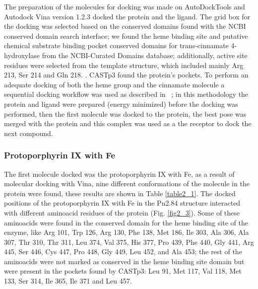 \documentclass[12pt]{article}
\newcommand{\textcite}[1]{\citeauthor{#1}~\citeyear{#1}}
\begin{document}
	The preparation of the molecules for docking was made on AutoDockTools and Autodock Vina version 1.2.3 docked the protein and the ligand. \cite{adt,vina,vina_2} The grid box for the docking was selected based on the conserved domains found with the NCBI conserved domain search interface; we found the heme binding site and putative chemical substrate binding pocket conserved domains for trans-cinnamate 4-hydroxylase from the NCBI-Curated Domains database; additionally, active site residues were selected from the template structure, which included mainly Arg 213, Ser 214 and Gln 218. \cite{cdd,cdd_2}.  CASTp3 found the protein's pockets. \cite{castp} To perform an adequate docking of both the heme group and the cinnamate molecule a sequential docking workflow was used as described in \textcite{sequential}; in this methodology the protein and ligand were prepared (energy minimized) before the docking was performed, then the first molecule was  docked to the protein, the best pose was merged with the protein and this complex was used as a the receptor to dock the next compound.
	
	\newpage
	\subsubsection{Protoporphyrin IX with Fe}
	
	The first molecule docked was the protoporphyrin IX with Fe, as a result of molecular docking with Vina, nine different conformations of the molecule in the protein were found, these results are shown in Table \ref{table2_1}. The docked positions of the protoporphyrin IX with Fe in the Pn2.84 structure interacted with different aminoacid residues of the protein (Fig. \ref{fig2_3}). Some of these aminoacids were found in the conserved domain for the heme binding site of the enzyme, like Arg 101, Trp 126, Arg 130, Phe 138, Met 186, Ile 303, Ala 306, Ala 307, Thr 310, Thr 311, Leu 374, Val 375, His 377, Pro 439, Phe 440, Gly 441, Arg 445, Ser 446, Cys 447, Pro 448, Gly 449, Leu 452, and Ala 453; the rest of the aminoacids were not marked as conserved in the heme binding site domain but were present in the pockets found by CASTp3: Leu 91, Met 117, Val 118, Met 133, Ser 314, Ile 365, Ile 371 and Leu 457.
	
\end{document}
